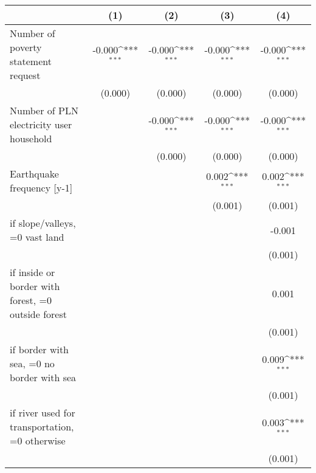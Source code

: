 {
\def\sym#1{\ifmmode^{#1}\else\(^{#1}\)\fi}
\begin{tabular}{l*{4}{c}}
\toprule
                    &\multicolumn{1}{c}{(1)}         &\multicolumn{1}{c}{(2)}         &\multicolumn{1}{c}{(3)}         &\multicolumn{1}{c}{(4)}         \\
\midrule
Number of poverty statement request&      -0.000\sym{***}&      -0.000\sym{***}&      -0.000\sym{***}&      -0.000\sym{***}\\
                    &     (0.000)         &     (0.000)         &     (0.000)         &     (0.000)         \\
\addlinespace
Number of PLN electricity user household&                     &      -0.000\sym{***}&      -0.000\sym{***}&      -0.000\sym{***}\\
                    &                     &     (0.000)         &     (0.000)         &     (0.000)         \\
\addlinespace
Earthquake frequency [y-1]&                     &                     &       0.002\sym{***}&       0.002\sym{***}\\
                    &                     &                     &     (0.001)         &     (0.001)         \\
\addlinespace
=1 if slope/valleys, =0 vast land&                     &                     &                     &      -0.001         \\
                    &                     &                     &                     &     (0.001)         \\
\addlinespace
=1 if inside or border with forest, =0 outside forest&                     &                     &                     &       0.001         \\
                    &                     &                     &                     &     (0.001)         \\
\addlinespace
=1 if border with sea, =0 no border with sea&                     &                     &                     &       0.009\sym{***}\\
                    &                     &                     &                     &     (0.001)         \\
\addlinespace
=1 if river used for transportation, =0 otherwise&                     &                     &                     &       0.003\sym{***}\\
                    &                     &                     &                     &     (0.001)         \\

\end{tabular}}
